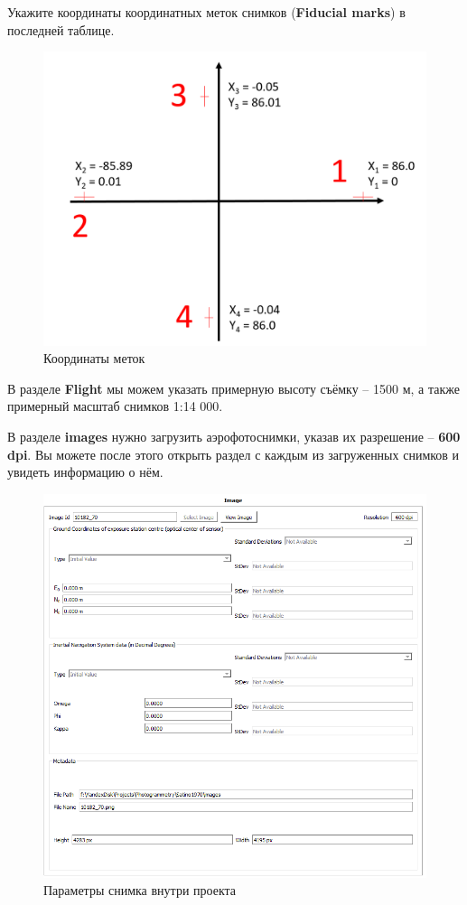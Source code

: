 \documentclass[
  12pt,
]{book}
\begin{document}
Укажите координаты координатных меток снимков (\textbf{Fiducial marks}) в последней таблице.

\begin{figure}
\centering
\includegraphics{images/Ref13/Fiducial.png}
\caption{Координаты меток}
\end{figure}

В разделе \textbf{Flight} мы можем указать примерную высоту съёмку -- 1500 м, а также примерный масштаб снимков 1:14 000.

В разделе \textbf{images} нужно загрузить аэрофотоснимки, указав их разрешение -- \textbf{600 dpi}. Вы можете после этого открыть раздел с каждым из загруженных снимков и увидеть информацию о нём.

\begin{figure}
\centering
\includegraphics{images/Ref13/Image_Properties.png}
\caption{Параметры снимка внутри проекта}
\end{figure}
\end{document}
